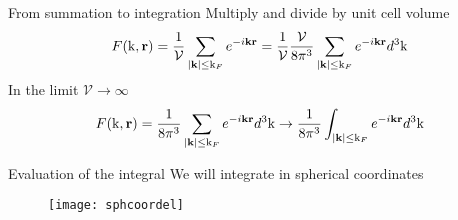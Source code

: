 \begin{frame}{From summation to integration}
  Multiply and divide by unit cell volume
  \begin{equation*}
    F(\text{k}, \textbf{r}) = \frac{1}{\mathcal{V}} \sum_{\abs{\textbf{k}}\leq \text{k}_F} e^{- i \textbf{k}\textbf{r}} =
    \frac{1}{\mathcal{V}} \frac{\mathcal{V}}{ 8 \pi^3} \sum_{\abs{\textbf{k}}\leq \text{k}_F} e^{- i \textbf{k}\textbf{r}} d^3\text{k}
  \end{equation*}
  \vspace{0.5cm}
  In the limit $\mathcal{V} \to \infty$
  \begin{equation*}
    F(\text{k}, \textbf{r}) = \frac{1}{8 \pi^3} \sum_{\abs{\textbf{k}}\leq \text{k}_F} e^{- i \textbf{k}\textbf{r}} d^3\text{k}
    \to
    \frac{1}{8 \pi^3} \int_{\abs{\textbf{k}}\leq \text{k}_F} e^{- i \textbf{k}\textbf{r}} d^3\text{k}
  \end{equation*}
\end{frame}

\begin{frame}[t]{Evaluation of the integral}
  \vspace{0.2cm}
  We will integrate in spherical coordinates
  \vfill
  \begin{figure}
    \texttt{[image: sphcoordel]}
    \label{sphcoordel}
  \end{figure}
\end{frame}

